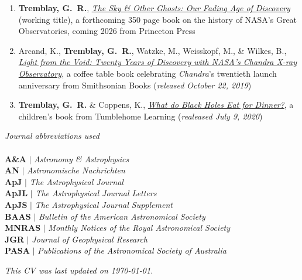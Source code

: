\documentclass[11pt]{article}
\begin{document}
\begin{enumerate}

\item \textbf{Tremblay, G.~R.}, \ul{\textit{The Sky \& Other Ghosts: Our Fading Age of Discovery}} (working title), a forthcoming 350 page book on the history of NASA's Great Observatories, coming 2026 from Princeton Press

\item Arcand, K., \textbf{Tremblay, G.~R.}, Watzke, M., Weisskopf, M., \& Wilkes, B., \ul{\textit{Light from the Void: Twenty Years of Discovery with NASA's Chandra X-ray Observatory}}, a coffee table book celebrating \textit{Chandra}'s
twentieth launch anniversary from Smithsonian Books (\textit{released October 22, 2019})

\item \textbf{Tremblay, G.~R.} \& Coppens, K., \uline{\textit{What do Black Holes Eat for Dinner?}}, a children's book from Tumblehome Learning (\textit{realeased July 9, 2020})

\end{enumerate}


\noindent \textit{Journal abbreviations used}\\ \\
\textbf{A\&A} $|$ \textit{Astronomy \& Astrophysics}\\
\textbf{AN} $|$ \textit{Astronomische Nachrichten} \\
\textbf{ApJ} $|$ \textit{The Astrophysical Journal}\\
\textbf{ApJL} $|$ \textit{The Astrophysical Journal Letters}\\
\textbf{ApJS} $|$ \textit{The Astrophysical Journal Supplement}\\
\textbf{BAAS} $|$ \textit{Bulletin of the American Astronomical Society}\\
\textbf{MNRAS} $|$ \textit{Monthly Notices of the Royal Astronomical Society}\\
\textbf{JGR} $|$ \textit{Journal of Geophysical Research}\\
\textbf{PASA} $|$ \textit{Publications of the Astronomical Society of Australia}





\vfill

\begin{center}
\noindent \textit{This CV was last updated on \today.}
\end{center}
\end{document}
